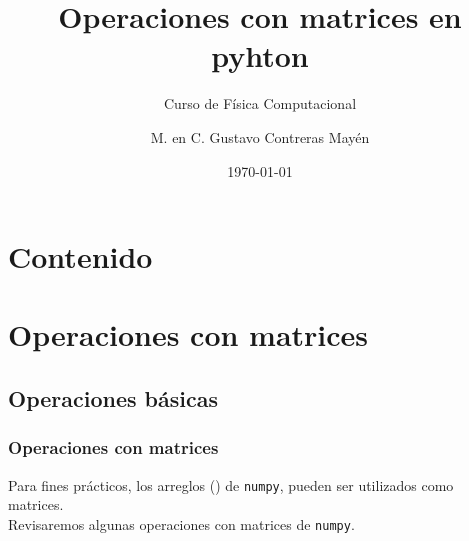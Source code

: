 


	
\normalfont
\usepackage{ccfonts}%
\usepackage[T1]{fontenc}%
\renewcommand{\rmdefault}{cmr}%
\linespread{1.3}
\title{Operaciones con matrices en pyhton}
\subtitle{Curso de Física Computacional}
\author{M. en C. Gustavo Contreras Mayén}
\date{\today}

\maketitle
\fontsize{14}{14}\selectfont
{}
\section*{Contenido}
\section{Operaciones con matrices}
\subsection{Operaciones básicas}
\begin{frame}
\frametitle{Operaciones con matrices}
Para fines prácticos, los arreglos () de \texttt{numpy}, pueden ser utilizados como matrices.
\\
Revisaremos algunas operaciones con matrices de \texttt{numpy}.
\end{frame}
